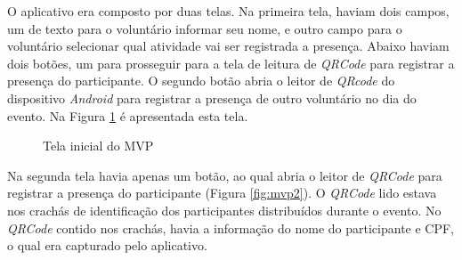 O aplicativo era composto por duas telas. Na primeira tela, haviam dois campos, um de texto para o voluntário informar seu nome, e outro campo para o voluntário selecionar qual atividade vai ser registrada a presença. Abaixo haviam dois botões, um para prosseguir para a tela de leitura de \textit{QRCode} para registrar a presença do participante. O segundo botão abria o leitor de \textit{QRcode} do dispositivo \textit{Android} para registrar a presença de outro voluntário no dia do evento. Na Figura \ref{fig:mvp1} é apresentada esta tela.

\begin{figure}[H]
    \centering
    \caption{Tela inicial do MVP} 
    \label{fig:mvp1}
\end{figure}

Na segunda tela havia apenas um botão, ao qual abria o leitor de \textit{QRCode} para registrar a presença do participante (Figura \ref{fig:mvp2}). O \textit{QRCode} lido estava nos crachás de identificação dos participantes distribuídos durante o evento. No \textit{QRCode} contido nos crachás, havia a informação do nome do participante e CPF, o qual era capturado pelo aplicativo.

